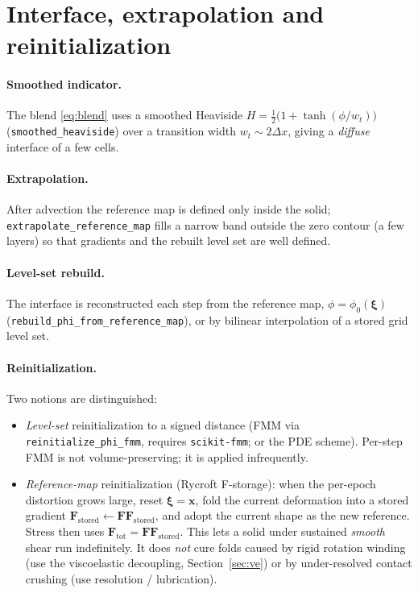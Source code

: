\documentclass[11pt]{article}
\newcommand{\xv}{\bm{x}}
\newcommand{\xiv}{\bm{\xi}}
\newcommand{\Ften}{\bm{F}}
\begin{document}
\section{Interface, extrapolation and reinitialization}
\label{sec:interface}
\paragraph{Smoothed indicator.} The blend \eqref{eq:blend} uses a smoothed Heaviside
$H=\tfrac12\bigl(1+\tanh(\phi/w_t)\bigr)$ (\texttt{smoothed\_heaviside}) over a
transition width $w_t\sim 2\Delta x$, giving a \emph{diffuse} interface of a few
cells.
\paragraph{Extrapolation.} After advection the reference map is defined only inside
the solid; \texttt{extrapolate\_reference\_map} fills a narrow band outside the zero
contour (a few layers) so that gradients and the rebuilt level set are well defined.
\paragraph{Level-set rebuild.} The interface is reconstructed each step from the
reference map, $\phi=\phi_0(\xiv)$ (\texttt{rebuild\_phi\_from\_reference\_map}), or
by bilinear interpolation of a stored grid level set.
\paragraph{Reinitialization.} Two notions are distinguished:
\begin{itemize}[nosep]
  \item \emph{Level-set} reinitialization to a signed distance (FMM via
  \texttt{reinitialize\_phi\_fmm}, requires \texttt{scikit-fmm}; or the PDE scheme).
  Per-step FMM is not volume-preserving; it is applied infrequently.
  \item \emph{Reference-map} reinitialization (Rycroft F-storage): when the
  per-epoch distortion grows large, reset $\xiv=\xv$, fold the current deformation
  into a stored gradient $\Ften_{\text{stored}}\!\leftarrow\!\Ften\Ften_{\text{stored}}$,
  and adopt the current shape as the new reference. Stress then uses
  $\Ften_{\text{tot}}=\Ften\Ften_{\text{stored}}$. This lets a solid under sustained
  \emph{smooth} shear run indefinitely. It does \emph{not} cure folds caused by
  rigid rotation winding (use the viscoelastic decoupling, Section~\ref{sec:ve}) or
  by under-resolved contact crushing (use resolution / lubrication).
\end{itemize}
\end{document}
